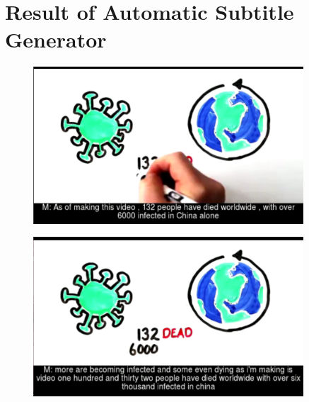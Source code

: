 \documentclass[natbib]{muthesis}
\begin{document}
 
 \section{Result of Automatic Subtitle Generator}
 
 \begin{figure}[H]
 	\begin{minipage}{0.5\textwidth}
 		\centering
 		\includegraphics[width=0.9\textwidth]{images/example-video-aws} 
 		\label{fig:example-video-aws]}
 	\end{minipage}\hfill
 	\begin{minipage}{0.5\textwidth}
 		\centering
 		\includegraphics[width=0.9\textwidth]{images/example-video-cmusphinx} 
 		\label{fig:example-video-cmusphinx}
 	\end{minipage}
 \end{figure}
 
\end{document}
